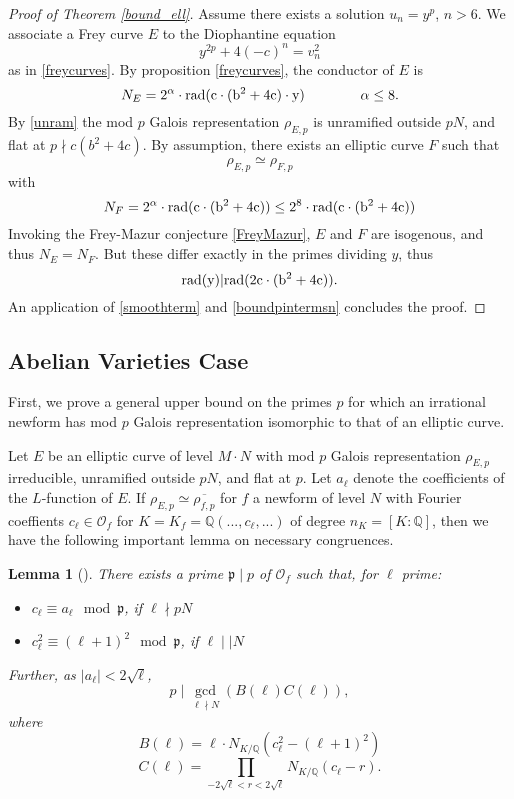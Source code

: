 \documentclass[12pt]{amsart}
\newtheorem{lem}[thm]{Lemma}
\theoremstyle{definition}
\def\O{{\mathcal O}}
\def\Q{{\mathbb Q}}
\newcommand{\rad}{\rm rad}
\renewcommand{\bar}{\overline}
\newcommand{\notdiv}{\nmid}
\begin{document}
\begin{proof}[Proof of Theorem \ref{bound_ell}]
Assume there exists a solution $u_n = y^p$, $n > 6$.
We associate a Frey curve $E$ to the Diophantine equation
\[ y^{2p} +4(-c)^n = v_n^2 \]
as in \ref{freycurves}.  By proposition \ref{freycurves}, the conductor of $E$ is
\[ N_E = 2^{\alpha}  \cdot \rad( c \cdot (b^2+4c) \cdot y) \qquad \qquad \alpha \leq 8. \]
By \ref{unram} the mod $p$ Galois representation $\rho_{E,p}$ is unramified outside $pN$, and flat at $p \notdiv c(b^2+4c)$. By assumption, there exists an elliptic curve $F$ such that
\[ \rho_{E,p} \simeq \rho_{F,p} \]  
with
\[N_F = 2^{\alpha} \cdot  \rad( c \cdot (b^2+4c)) \leq 2^8 \cdot \rad(c \cdot (b^2+4c))  \]
Invoking the Frey-Mazur conjecture \ref{FreyMazur}, $E$ and $F$ are isogenous, and thus $N_E = N_F$.  But these differ exactly in the primes dividing $y$, thus
\[ \rad(y) | \rad(2c \cdot (b^2+4c)). \]
 An application of \ref{smoothterm} and \ref{boundpintermsn} concludes the proof.
\end{proof}


\subsection{Abelian Varieties Case}
First, we prove a general upper bound on the primes $p$ for which an irrational newform has mod $p$ Galois representation isomorphic to that of an elliptic curve.
 
Let $E$ be an elliptic curve of level $M \cdot N$ with mod $p$ Galois representation $\rho_{E,p}$ irreducible, unramified outside $pN$, and flat at $p$. Let $a_\ell$ denote the coefficients of the $L$-function of $E$.  If $\rho_{E,p} \simeq \bar{\rho_{f,p}}$ for $f$ a newform of level $N$ with Fourier coeffients $c_\ell\in \O_f$ for $K = K_f = \Q(...,c_\ell,...)$ of degree $n_K = [K:\mathbb{Q}]$, then we have the following important lemma on necessary congruences.

\begin{lem}[\cite{cohen06}]\label{ircong1}
There exists a prime $\mathfrak{p} \mid p$ of $\mathcal{O}_f$ such that, for $\ell$ prime:
\begin{itemize}
\item $c_\ell \equiv a_\ell \mod \mathfrak{p}$, if $\ell \nmid pN$
\item $c_\ell^2 \equiv (\ell+1)^2 \mod \mathfrak{p}$, if $\ell \mid\mid N$
\end{itemize}
Further, as $|a_\ell| < 2\sqrt{\ell}$,
\[p \mid \gcd_{\ell \nmid N}(B(\ell)C(\ell)), \] where
\[B(\ell) = \ell \cdot N_{K / \mathbb{Q}}(c_\ell^2-(\ell+1)^2) \]
\[C(\ell) = \prod_{-2\sqrt{\ell} < r < 2\sqrt{\ell}}{N_{K / \mathbb{Q}}}(c_\ell - r).\]
\end{lem}
\end{document}
